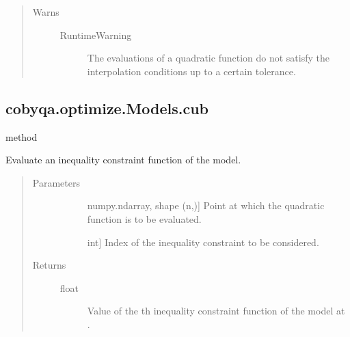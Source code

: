 \documentclass[letterpaper,10pt,english]{sphinxmanual}
\begin{document}
\begin{fulllineitems}
\begin{fulllineitems}
\begin{quote}
\begin{description}
\begin{description}
\end{description}

\item[{Warns}] \leavevmode\begin{description}
\item[{RuntimeWarning}] \leavevmode
\sphinxAtStartPar
The evaluations of a quadratic function do not satisfy the
interpolation conditions up to a certain tolerance.

\end{description}

\end{description}\end{quote}

\end{fulllineitems}



\subsection{cobyqa.optimize.Models.cub}
\label{\detokenize{refs/generated/cobyqa.optimize.Models.cub:cobyqa-optimize-models-cub}}\label{\detokenize{refs/generated/cobyqa.optimize.Models.cub::doc}}
\sphinxAtStartPar
method

\begin{fulllineitems}
\label{\detokenize{refs/generated/cobyqa.optimize.Models.cub:cobyqa.optimize.Models.cub}}
\sphinxAtStartPar
Evaluate an inequality constraint function of the model.
\begin{quote}\begin{description}
\item[{Parameters}] \leavevmode\begin{description}
\item[{}] \leavevmode{[}numpy.ndarray, shape (n,){]}
\sphinxAtStartPar
Point at which the quadratic function is to be evaluated.

\item[{}] \leavevmode{[}int{]}
\sphinxAtStartPar
Index of the inequality constraint to be considered.

\end{description}

\item[{Returns}] \leavevmode\begin{description}
\item[{float}] \leavevmode
\sphinxAtStartPar
Value of the \sphinxhyphen{}th inequality constraint function of the model at
.


\end{description}
\end{description}
\end{quote}
\end{fulllineitems}
\end{fulllineitems}
\end{document}
